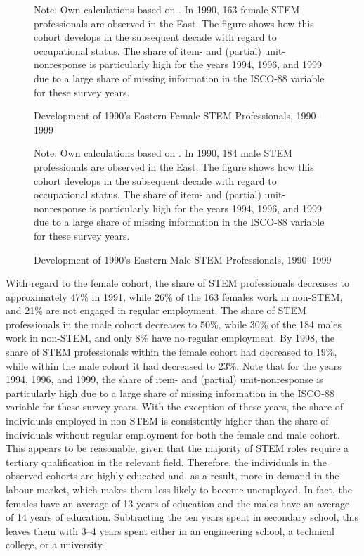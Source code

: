 \documentclass[a4paper, oneside, hyperfootnotes = false]{article}
\begin{document}
{\begin{figure}[ht]
	\centering
	\caption{Development of 1990's Eastern Female STEM Professionals, 1990--1999}
	\label{fig:survivalfemale}
	\fontsize{9pt}{11pt}\selectfont
	\def\svgwidth{.9\textwidth}
	
	\vspace{2mm}
	\parbox{10cm}{
		\linespread{1}\footnotesize Note: Own calculations based on \cite{SOEP2023}. In 1990, 163 female STEM professionals are observed in the East. The figure shows how this cohort develops in the subsequent decade with regard to occupational status. The share of item- and (partial) unit-nonresponse is particularly high for the years 1994, 1996, and 1999 due to a large share of missing information in the ISCO-88 variable for these survey years.}
\end{figure}

\begin{figure}[ht]
	\centering
	\caption{Development of 1990's Eastern Male STEM Professionals, 1990--1999}
	\label{fig:survivalmale}
	\fontsize{9pt}{11pt}\selectfont
	\def\svgwidth{.9\textwidth}
	
	\vspace{2mm}
	\parbox{10cm}{
		\linespread{1}\footnotesize Note: Own calculations based on \cite{SOEP2023}. In 1990, 184 male STEM professionals are observed in the East. The figure shows how this cohort develops in the subsequent decade with regard to occupational status. The share of item- and (partial) unit-nonresponse is particularly high for the years 1994, 1996, and 1999 due to a large share of missing information in the ISCO-88 variable for these survey years.}
\end{figure}

With regard to the female cohort, the share of STEM professionals decreases to approximately 47\% in 1991, while 26\% of the 163 females work in non-STEM, and 21\% are not engaged in regular employment.
The share of STEM professionals in the male cohort decreases to 50\%, while 30\% of the 184 males work in non-STEM, and only 8\% have no regular employment.
By 1998, the share of STEM professionals within the female cohort had decreased to 19\%, while within the male cohort it had decreased to 23\%.
Note that for the years 1994, 1996, and 1999, the share of item- and (partial) unit-nonresponse is particularly high due to a large share of missing information in the ISCO-88 variable for these survey years.
With the exception of these years, the share of individuals employed in non-STEM is consistently higher than the share of individuals without regular employment for both the female and male cohort.
This appears to be reasonable, given that the majority of STEM roles require a tertiary qualification in the relevant field.
Therefore, the individuals in the observed cohorts are highly educated and, as a result, more in demand in the labour market, which makes them less likely to become unemployed.
In fact, the females have an average of 13 years of education and the males have an average of 14 years of education.
Subtracting the ten years spent in secondary school, this leaves them with 3--4 years spent either in an engineering school, a technical college, or a university.

}
\end{document}
